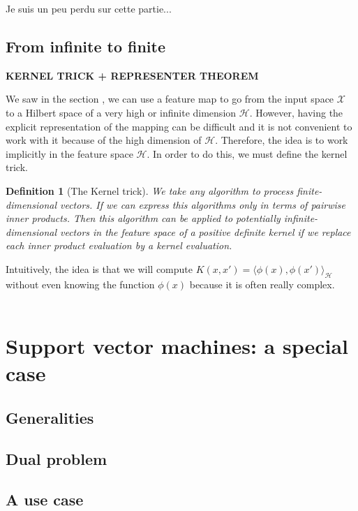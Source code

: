 \documentclass[a4paper, 11pt]{article}
\newtheorem{definition}{Definition}
\begin{document}
{\color{red} Je suis un peu perdu sur cette partie... }

\subsection{From infinite to finite}

{\bf \color{red} KERNEL TRICK + REPRESENTER THEOREM}

We saw in the section , we can use a feature map to go from the input space $\mathcal{X}$ to a Hilbert space of a very high or infinite dimension $\mathcal{H}$. However, having the explicit representation of the mapping can be difficult and it is not convenient to work with it because of the high dimension of $\mathcal{H}$. Therefore, the idea is to work implicitly in the feature space $\mathcal{H}$. In order to do this, we must define the kernel trick.

\begin{definition} [The Kernel trick]
We take any algorithm to process finite-dimensional vectors. If we can express this algorithms only in terms of pairwise inner products. Then this algorithm can be applied to potentially infinite-dimensional vectors in the feature space of a positive definite kernel if we replace each inner product evaluation by a kernel evaluation.
\end{definition}

Intuitively, the idea is that we will compute $K(x,x') = \langle\phi(x),\phi(x')\rangle_{\mathcal{H}}$ without even knowing the function $\phi(x)$ because it is often really complex.
\\\\



\section{Support vector machines: a special case}
\subsection{Generalities}
\subsection{Dual problem}
\subsection{A use case}
\end{document}
